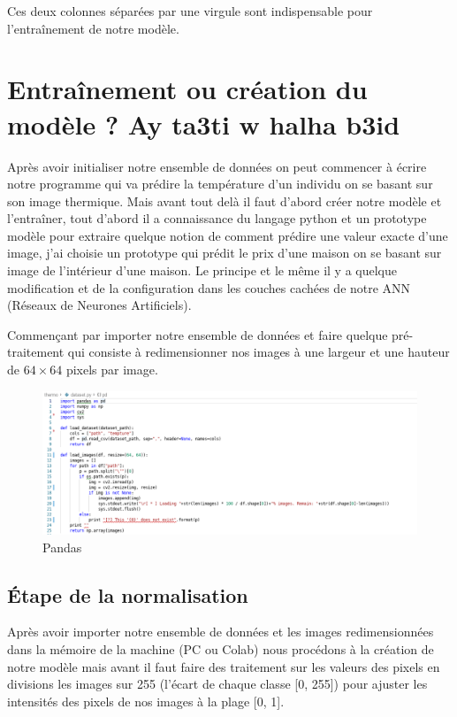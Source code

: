\documentclass[12pt]{article}
\begin{document}
Ces deux colonnes séparées par une virgule sont indispensable pour l’entraînement de notre modèle.

\section{Entraînement ou création du modèle ? Ay ta3ti w halha b3id}
Après avoir initialiser notre ensemble de données on peut commencer à écrire notre programme qui va prédire la température d’un individu on se basant sur son image thermique. Mais avant tout delà il faut d’abord créer notre modèle et l’entraîner, tout d’abord il a  connaissance du langage python et un prototype modèle pour extraire quelque notion de comment prédire une valeur exacte d’une image, j’ai choisie un prototype qui prédit le prix d’une maison on se basant sur image de l'intérieur d’une maison. Le principe et le même il y a quelque modification et de la configuration dans les couches cachées de notre ANN (Réseaux de Neurones Artificiels).

Commençant par importer notre ensemble de données et faire quelque pré-traitement qui consiste à redimensionner nos images à une largeur et une hauteur de $64 \times 64$ pixels par image.

\begin{figure}[h]
	\centering
	\includegraphics[width=16cm]{img-Chapiter-4/loaddataset.png}
	\caption{Pandas}
\end{figure}
\subsection*{\' Etape de la normalisation}
Après avoir importer notre ensemble de données et les images redimensionnées dans la mémoire de la machine (PC ou Colab) nous procédons à la création de notre modèle mais avant il faut faire des traitement sur les valeurs des pixels en divisions les images sur 255 (l’écart de chaque classe [0, 255]) pour ajuster les intensités des pixels de nos images à la plage [0, 1].
\end{document}
